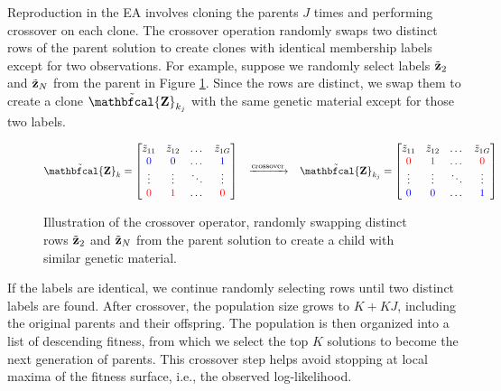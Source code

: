 \documentclass[12pt, centerh1]{article}
\begin{document}
Reproduction in the EA involves cloning the parents $J$ times and performing crossover on each clone. The crossover operation randomly swaps two distinct rows of the parent solution to create clones with identical membership labels except for two observations. For example, suppose we randomly select labels $\tilde{\bf z}_2$ and $\tilde{\bf z}_N$ from the parent in Figure \ref{fig:crossover}. Since the rows are distinct, we swap them to create a clone $\tilde{ \bf \mathbfcal{Z} }_{k_j}$ with the same genetic material except for those two labels.  
\begin{figure}[h]
$$\tilde{\bf {\mathbfcal{Z}}}_{k} = 
\begin{bmatrix} \tilde{z}_{11} & \tilde{z}_{12} & \dots & \tilde{z}_{1G} \\
    \textcolor{blue}{0} & \textcolor{blue}{0} & \dots & \textcolor{blue}{1} \\
    \vdots & \vdots & \ddots & \vdots \\
    \textcolor{red}{0}&\textcolor{red}{1}& \dots & \textcolor{red}{0}\\
\end{bmatrix} 
\;
\;
\;
\xrightarrow{\text{crossover}}
\;
\;
\;
\tilde{ \bf \mathbfcal{Z} }_{k_j} = 
\begin{bmatrix}
    \tilde{z}_{11} & \tilde{z}_{12} & \dots & \tilde{z}_{1G} \\
    \textcolor{red}{0} & \textcolor{red}{1} & \dots & \textcolor{red}{0} \\
    \vdots & \vdots & \ddots & \vdots \\
    \textcolor{blue}{0}&\textcolor{blue}{0}& \dots & \textcolor{blue}{1}\\
\end{bmatrix}   $$
\caption{Illustration of the crossover operator, randomly swapping distinct rows $\tilde{\bf z}_2$ and $\tilde{\bf z}_N$ from the parent solution to create a child with similar genetic material.}
\label{fig:crossover}
\end{figure}

If the labels are identical, we continue randomly selecting rows until two distinct labels are found. After crossover, the population size grows to $K + KJ$, including the original parents and their offspring. The population is then organized into a list of descending fitness, from which we select the top $K$ solutions to become the next generation of parents. This crossover step helps avoid stopping at local maxima of the fitness surface, i.e., the observed log-likelihood. 
\end{document}
